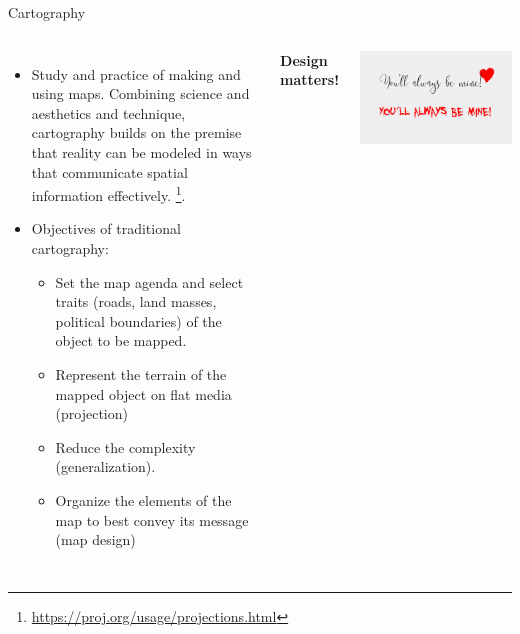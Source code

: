 \documentclass[11pt,dvipsnames,ignorenonframetext,aspectratio=169]{beamer}
\providecommand{\tightlist}{%
  \setlength{\itemsep}{0pt}\setlength{\parskip}{0pt}}
\newcommand{\bcolumns}{\begin{columns}[T, onlytextwidth]}
\newcommand{\ecolumns}{\end{columns}}
\begin{document}
\begin{frame}{Cartography}
\protect\hypertarget{cartography}{}
\bcolumns
{}
\small

\begin{itemize}
\tightlist
\item
  Study and practice of making and using maps. Combining science and
  aesthetics and technique, cartography builds on the premise that
  reality can be modeled in ways that communicate spatial information
  effectively.
  \footnote[frame]{\url{https://proj.org/usage/projections.html}}.
\item
  Objectives of traditional cartography:

  \begin{itemize}
  \tightlist
  \item
    Set the map agenda and select traits (roads, land masses, political
    boundaries) of the object to be mapped.
  \item
    Represent the terrain of the mapped object on flat media
    (projection)
  \item
    Reduce the complexity (generalization).
  \item
    Organize the elements of the map to best convey its message (map
    design)
  \end{itemize}
\end{itemize}


\textbf{Design matters!}

\includegraphics[width=0.98\linewidth]{../images/you-will-always-be-mine-psychology}

\ecolumns
\end{frame}
\end{document}
